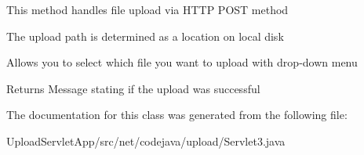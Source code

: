 \begin{DoxyItemize}
\item This method handles file upload via H\+T\+T\+P P\+O\+S\+T method
\item The upload path is determined as a location on local disk
\item Allows you to select which file you want to upload with drop-\/down menu \begin{DoxyReturn}{Returns}
Message stating if the upload was successful 
\end{DoxyReturn}

\end{DoxyItemize}

The documentation for this class was generated from the following file\+:\begin{DoxyCompactItemize}
\item 
Upload\+Servlet\+App/src/net/codejava/upload/Servlet3.\+java\end{DoxyCompactItemize}
